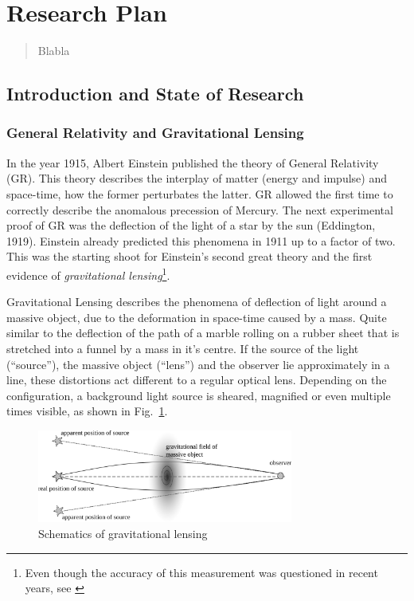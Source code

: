 \documentclass[11pt]{article}
\begin{document}
\newpage

\section*{Research Plan}

\begin{abstract}
Blabla
\end{abstract}


\subsection{Introduction and State of Research}
\label{sec:intro}

\subsubsection{General Relativity and Gravitational Lensing}

In the year 1915, Albert Einstein published the theory of General Relativity (GR).
This theory describes the interplay of matter (energy and impulse) and space-time, how the former perturbates the latter.
GR allowed the first time to correctly describe the anomalous precession of Mercury.
The next experimental proof of GR was the deflection of the light of a star by the sun (Eddington, 1919).
Einstein already predicted this phenomena in 1911 up to a factor of two.
This was the starting shoot for Einstein’s second great theory and the first evidence of \emph{gravitational lensing}\footnote{Even though the accuracy of this measurement was questioned in recent years, see \cite{kennefick2009testing}}.

Gravitational Lensing describes the phenomena of deflection of light around a massive object, due to the deformation in space-time caused by a mass.
Quite similar to the deflection of the path of a marble rolling on a rubber sheet that is stretched into a funnel by a mass in it's centre.
If the source of the light (``source''), the massive object (``lens'') and the observer lie approximately in a line, these distortions act different to a regular optical lens.
Depending on the configuration, a background light source is sheared, magnified or even multiple times visible, as shown in Fig.~\ref{fig:grav_lens}.

\begin{figure}[h]
	\centering
		\includegraphics[width=0.75\textwidth]{img/grav_lens}
	\caption{Schematics of gravitational lensing}
	\label{fig:grav_lens}
\end{figure}
\end{document}
